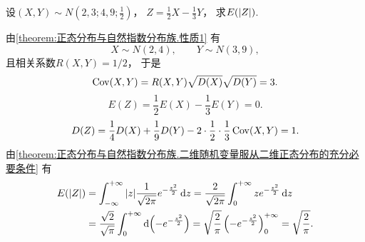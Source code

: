\begin{example}
设\((X,Y) \sim N\left(2,3;4,9;\frac{1}{2}\right)\)，
\(Z = \frac{1}{2} X - \frac{1}{3} Y\)，
求\(E(\abs{Z})\).
\begin{solution}
由\cref{theorem:正态分布与自然指数分布族.性质1} 有\begin{equation*}
	X \sim N(2,4), \qquad
	Y \sim N(3,9),
\end{equation*}且相关系数\(R(X,Y) = 1/2\)，
于是\begin{equation*}
	\operatorname{Cov}(X,Y) = R(X,Y) \sqrt{D(X)} \sqrt{D(Y)} = 3.
\end{equation*}\begin{equation*}
	E(Z) = \frac{1}{2} E(X) - \frac{1}{3} E(Y) = 0.
\end{equation*}\begin{equation*}
	D(Z) = \frac{1}{4} D(X) + \frac{1}{9} D(Y)
		- 2 \cdot \frac{1}{2} \cdot \frac{1}{3} \operatorname{Cov}(X,Y)
	= 1.
\end{equation*}
由\cref{theorem:正态分布与自然指数分布族.二维随机变量服从二维正态分布的充分必要条件}
有\begin{align*}
	E(\abs{Z})
	&= \int_{-\infty}^{+\infty} \abs{z} \frac{1}{\sqrt{2\pi}} e^{-\frac{z^2}{2}} \dd{z}
	= \frac{2}{\sqrt{2\pi}} \int_0^{+\infty} z e^{-\frac{z^2}{2}} \dd{z} \\
	&= \frac{\sqrt{2}}{\sqrt{\pi}} \int_0^{+\infty} \dd(-e^{-\frac{z^2}{2}})
	= \sqrt{\frac{2}{\pi}} \left(-e^{-\frac{z^2}{2}}\right)_0^{+\infty}
	= \sqrt{\frac{2}{\pi}}.
\end{align*}
\end{solution}
\end{example}

